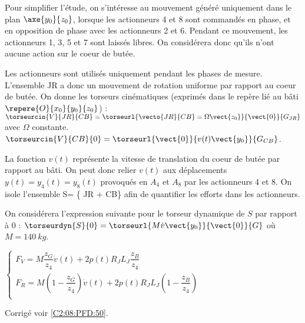 Pour simplifier l’étude, on s’intéresse au mouvement généré uniquement dans le plan 
$\axe{y_0}{z_0}$, lorsque les actionneurs 4 et 8 sont commandés en phase, et en opposition de
phase avec les actionneurs 2 et 6. Pendant ce mouvement, les actionneurs 1, 3, 5 et 7 sont
laissés libres. On considérera donc qu’ils n’ont aucune action sur le coeur de butée.

\ifprof
\else
\fi

Les actionneurs sont utilisés uniquement pendant les phases de mesure. L’ensemble JR a
donc un mouvement de rotation uniforme par rapport au coeur de butée. On donne les
torseurs cinématiques (exprimés dans le repère lié au bâti $\repere{O}{x_0}{y_0}{z_0}$) : 
$\torseurcin{V}{JR}{CB} =\torseurl{\vecto{JR}{CB}=\Omega\vect{z_0}}{\vect{0}}{G_{JR}}$ avec $\Omega$ constante.
$\torseurcin{V}{CB}{0} =\torseurl{\vect{0}}{v(t)\vect{y_0}}{G_{CB}}$.

La fonction $v(t)$ représente la vitesse de translation du coeur de butée par rapport au bâti.
On peut donc relier $v(t)$ aux déplacements $y(t) = y_4(t) = y_8(t)$ provoqués en $A_4$ et $A_8$
par les actionneurs 4 et 8.
On isole l’ensemble S= \{ JR + CB\} afin de quantifier les efforts dans les actionneurs.

On considérera l’expression suivante pour le torseur dynamique de $S$ par rapport à 0 :
$\torseurdyn{S}{0}=\torseurl{M\dot{v}\vect{y_0}}{\vect{0}}{G}$
où $M = \SI{140}{kg}$.

\ifprof
\else
\fi


$\left\{
\begin{array}{l}
F_V = M\dfrac{z_G}{z_4}\dot{v}(t) + 2p(t)R_J L_J \dfrac{z_B}{z_4} \\
F_R = M\left(1-\dfrac{z_G}{z_4}\right)\dot{v}(t) + 2p(t)R_J L_J\left(1- \dfrac{z_B}{z_4}\right) \\
\end{array}
\right.$

\ifprof
\else
\fi

\ifprof
\else
\fi

\ifprof
\else
\begin{flushright}
\footnotesize{Corrigé voir \ref{C2:08:PFD:50}.}
\end{flushright}%
\fi